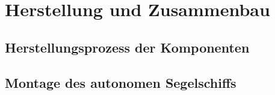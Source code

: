 

\chapter{Herstellung und Zusammenbau}
\label{chap:herstllung}


\section{Herstellungsprozess der Komponenten}
\section{Montage des autonomen Segelschiffs}